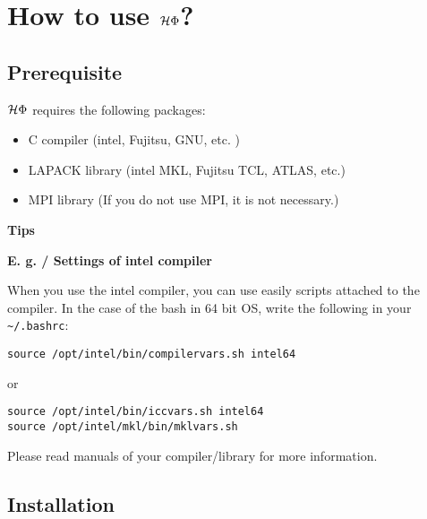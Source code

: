 \chapter{How to use $\mathcal{H} \Phi$?}
\label{Ch:HowTo}

\section{Prerequisite}

$\mathcal{H} \Phi$ requires the following packages:
\begin{itemize}
\item C compiler (intel, Fujitsu, GNU, etc. )
\item LAPACK library (intel MKL, Fujitsu TCL, ATLAS, etc.)
\item MPI library (If you do not use MPI, it is not necessary.)
\end{itemize}

\begin{screen}
\Large 
{\bf Tips}
\normalsize

{\bf E. g. / Settings of intel compiler}

When you use the intel compiler, you can use easily scripts attached to the compiler.
In the case of the bash in 64 bit OS, write the following in your \verb|~/.bashrc|:
\begin{verbatim}
source /opt/intel/bin/compilervars.sh intel64
\end{verbatim}
or
\begin{verbatim}
source /opt/intel/bin/iccvars.sh intel64
source /opt/intel/mkl/bin/mklvars.sh
\end{verbatim}

Please read manuals of your compiler/library for more information.

\end{screen}

\section{Installation}

\label{Sec:HowToInstall}

